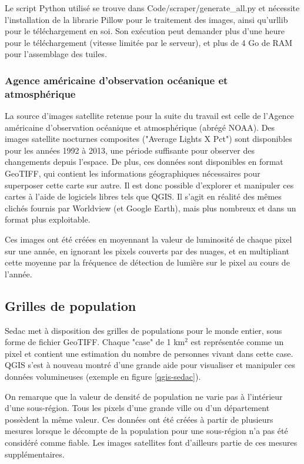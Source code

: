 \documentclass[a4paper, 11pt]{report}
\begin{document}
Le script Python utilisé se trouve dans Code/scraper/generate\_all.py et nécessite l'installation de la librarie Pillow pour le traitement des images, ainsi qu'urllib pour le téléchargement en soi. Son exécution peut demander plus d'une heure pour le téléchargement (vitesse limitée par le serveur), et plus de 4 Go de RAM pour l'assemblage des tuiles.

\subsubsection{Agence américaine d'observation océanique et atmosphérique}
La source d'images satellite retenue pour la suite du travail est celle de l'Agence américaine d'observation océanique et atmosphérique (abrégé NOAA)\cite{noaa}. Des images satellite nocturnes composites ("Average Lights X Pct") sont disponibles pour les années 1992 à 2013, une période suffisante pour observer des changements depuis l'espace. De plus, ces données sont disponibles en format GeoTIFF, qui contient les informations géographiques nécessaires pour superposer cette carte sur autre. Il est donc possible d'explorer et manipuler ces cartes à l'aide de logiciels libres tels que QGIS. Il s'agit en réalité des mêmes clichés fournis par Worldview (et Google Earth), mais plus nombreux et dans un format plus exploitable.

Ces images ont été créées en moyennant la valeur de luminosité de chaque pixel sur une année, en ignorant les pixels couverts par des nuages, et en multipliant cette moyenne par la fréquence de détection de lumière sur le pixel au cours de l'année.

\subsection{Grilles de population}
Sedac \cite{sedac} met à disposition des grilles de populations pour le monde entier, sous forme de fichier GeoTIFF. Chaque "case" de 1 km$^2$ est représentée comme un pixel et contient une estimation du nombre de personnes vivant dans cette case. QGIS s'est à nouveau montré d'une grande aide pour visualiser et manipuler ces données volumineuses (exemple en figure \ref{qgis-sedac}).

On remarque que la valeur de densité de population ne varie pas à l'intérieur d'une sous-région. Tous les pixels d'une grande ville ou d'un département possèdent la même valeur. Ces données ont été créées à partir de plusieurs mesures lorsque le décompte de la population pour une sous-région n'a pas été considéré comme fiable. Les images satellites font d'ailleurs partie de ces mesures supplémentaires.
\end{document}
